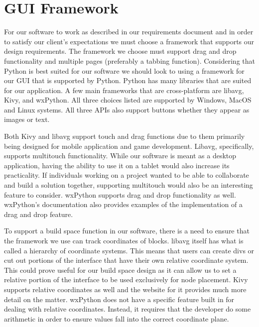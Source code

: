 \documentclass[journal,10pt,onecolumn,compsoc]{IEEEtran} \usepackage[margin=1.0in]{geometry} \usepackage{pdfpages} \usepackage{graphicx}
\begin{document}
\section{GUI Framework}

\noindent For our software to work as described in our requirements document and in order to satisfy our client's expectations we must choose a framework that supports our design requirements.
The framework we choose must support drag and drop functionality and multiple pages (preferably a tabbing function).
Considering that Python is best suited for our software we should look to using a framework for our GUI that is supported by Python.
Python has many libraries that are suited for our application.
A few main frameworks that are cross-platform are libavg, Kivy, and wxPython.
All three choices listed are supported by Windows, MacOS and Linux systems. 
All three APIs also support buttons whether they appear as images or text.

\noindent Both Kivy and libavg support touch and drag functions due to them primarily being designed for mobile application and game development. \cite{Kivy}\cite{libavg} 
Libavg, specifically, supports multitouch functionality.
While our software is meant as a desktop application, having the ability to use it on a tablet would also increase its practicality.
If individuals working on a project wanted to be able to collaborate and build a solution together, supporting multitouch would also be an interesting feature to consider.
wxPython supports drag and drop functionality as well. 
wxPython's documentation also provides examples of the implementation of a drag and drop feature. \cite{wxPython} 

\noindent To support a build space function in our software, there is a need to ensure that the framework we use can track coordinates of blocks.
libavg itself has what is called a hierarchy of coordinate systems. \cite{libavg} 
This means that users can create divs or cut out portions of the interface that have their own relative coordinate system.
This could prove useful for our build space design as it can allow us to set a relative portion of the interface to be used exclusively for node placement.
Kivy supports relative coordinates as well and the website for it provides much more detail on the matter. \cite{Kivy} 
wxPython does not have a specific feature built in for dealing with relative coordinates. \cite{wxPython}
Instead, it requires that the developer do some arithmetic in order to ensure values fall into the correct coordinate plane.
\end{document}
